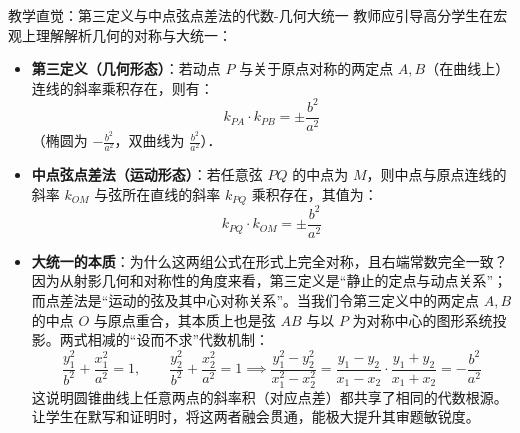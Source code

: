 \documentclass[11pt,a4paper]{ctexart}
\begin{document}
\begin{teachbox}{教学直觉：第三定义与中点弦点差法的代数-几何大统一}
教师应引导高分学生在宏观上理解解析几何的对称与大统一：
\begin{itemize}[itemsep=0.4em]
  \item \textbf{第三定义（几何形态）}：若动点 $P$ 与关于原点对称的两定点 $A, B$（在曲线上）连线的斜率乘积存在，则有：
        \[ k_{PA} \cdot k_{PB} = \pm \frac{b^2}{a^2} \]
        （椭圆为 $-\frac{b^2}{a^2}$，双曲线为 $\frac{b^2}{a^2}$）．
  \item \textbf{中点弦点差法（运动形态）}：若任意弦 $PQ$ 的中点为 $M$，则中点与原点连线的斜率 $k_{OM}$ 与弦所在直线的斜率 $k_{PQ}$ 乘积存在，其值为：
        \[ k_{PQ} \cdot k_{OM} = \pm \frac{b^2}{a^2} \]
  \item \textbf{大统一的本质}：为什么这两组公式在形式上完全对称，且右端常数完全一致？\\
        因为从射影几何和对称性的角度来看，第三定义是“静止的定点与动点关系”；而点差法是“运动的弦及其中心对称关系”。当我们令第三定义中的两定点 $A, B$ 的中点 $O$ 与原点重合，其本质上也是弦 $AB$ 与以 $P$ 为对称中心的图形系统投影。两式相减的“设而不求”代数机制：
        \[ \frac{y_1^2}{b^2} + \frac{x_1^2}{a^2} = 1, \qquad \frac{y_2^2}{b^2} + \frac{x_2^2}{a^2} = 1 \implies \frac{y_1^2-y_2^2}{x_1^2-x_2^2} = \frac{y_1-y_2}{x_1-x_2} \cdot \frac{y_1+y_2}{x_1+x_2} = -\frac{b^2}{a^2} \]
        这说明圆锥曲线上任意两点的斜率积（对应点差）都共享了相同的代数根源。让学生在默写和证明时，将这两者融会贯通，能极大提升其审题敏锐度。
\end{itemize}
\end{teachbox}

\newpage
\end{document}
